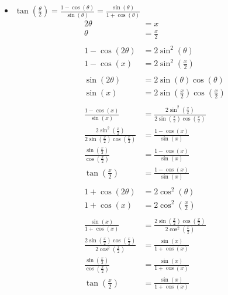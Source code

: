 \documentclass[12pt]{article}
\begin{document}
\begin{itemize}
    \item $\tan(\frac{\theta}{2}) = \frac{1 - \cos(\theta)}{\sin(\theta)} = \frac{\sin(\theta)}{1 + \cos(\theta)}$
        \begin{align*}
             2 \theta &= x \\
            \theta &= \frac{x}{2} \\ \\
            1 - \cos(2 \theta) &= 2\sin^2 \left(\theta\right) \\ 
            1 - \cos(x) &= 2\sin^2 \left(\frac{x}{2}\right) \\ \\
            \sin(2 \theta) &= 2 \sin(\theta) \cos(\theta) \\
            \sin(x) &= 2 \sin\left(\frac{x}{2}\right) \cos\left(\frac{x}{2}\right) \\ \\
            \frac{1 - \cos(x)}{\sin(x)} &= \frac{2\sin^2 \left(\frac{x}{2}\right)}{2 \sin\left(\frac{x}{2}\right) \cos\left(\frac{x}{2}\right)} \\
            \frac{2\sin^2 \left(\frac{x}{2}\right)}{2 \sin\left(\frac{x}{2}\right) \cos\left(\frac{x}{2}\right)} &= \frac{1 - \cos(x)}{\sin(x)} \\
            \frac{\sin\left(\frac{x}{2}\right)}{\cos\left(\frac{x}{2}\right)} &= \frac{1 - \cos(x)}{\sin(x)}  \\
            \tan \left(\frac{x}{2}\right) &= \frac{1 - \cos(x)}{\sin(x)} \tag*{$\square$} \\ \\
            1 + \cos(2 \theta) &= 2\cos^2(\theta) \\ 
            1 + \cos(x) &= 2\cos^2 \left(\frac{x}{2}\right) \\ \\
            \frac{\sin(x)}{1 + \cos(x)} &= \frac{2 \sin\left(\frac{x}{2}\right) \cos\left(\frac{x}{2}\right)}{2\cos^2 \left(\frac{x}{2}\right)} \\
            \frac{2 \sin\left(\frac{x}{2}\right) \cos\left(\frac{x}{2}\right)}{2\cos^2 \left(\frac{x}{2}\right)} &= \frac{\sin(x)}{1 + \cos(x)} \\
            \frac{\sin(\frac{x}{2})}{\cos(\frac{x}{2})} &= \frac{\sin(x)}{1 + \cos(x)}  \\
            \tan \left(\frac{x}{2}\right) &= \frac{\sin(x)}{1 + \cos(x)} \tag*{$\square$}
        \end{align*}    
       

\end{itemize}
\end{document}
